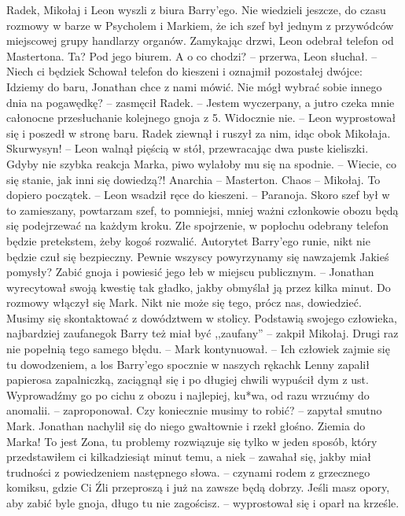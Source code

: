\documentclass[../MAIN.tex]{subfiles}
\begin{document}
Radek, Mikołaj i Leon wyszli z biura Barry’ego. Nie wiedzieli jeszcze, do czasu rozmowy w barze w Psycholem i Markiem, że ich szef był jednym z przywódców miejscowej grupy handlarzy organów. Zamykając drzwi, Leon odebrał telefon od Mastertona.
\sx Ta? Pod jego biurem. A o co chodzi? -- przerwa, Leon słuchał. -- Niech ci będzie\3k \qd
Schował telefon do kieszeni i oznajmił pozostałej dwójce:
\sx Idziemy do baru, Jonathan chce z nami mówić.
\xx Nie mógł wybrać sobie innego dnia na pogawędkę? -- zasmęcił Radek. -- Jestem wyczerpany, a jutro czeka mnie całonocne przesłuchanie kolejnego gnoja z 5.
\xx Widocznie nie. -- Leon wyprostował się i poszedł w stronę baru.
\qd
Radek ziewnął i ruszył za nim, idąc obok Mikołaja.
\sx Skurwysyn! -- Leon walnął pięścią w stół, przewracając dwa puste kieliszki. Gdyby nie szybka reakcja Marka, piwo wylałoby mu się na spodnie. -- Wiecie, co się stanie, jak inni się dowiedzą?!
\xx Anarchia -- Masterton.
\xx Chaos -- Mikołaj.
\xx To dopiero początek. -- Leon wsadził ręce do kieszeni. -- Paranoja. Skoro szef był w to zamieszany, powtarzam szef, to pomniejsi, mniej ważni członkowie obozu będą się podejrzewać na każdym kroku. Złe spojrzenie, w popłochu odebrany telefon będzie pretekstem, żeby kogoś rozwalić. Autorytet Barry’ego runie, nikt nie będzie czuł się bezpieczny. Pewnie wszyscy powyrzynamy się nawzajem\3k Jakieś pomysły?
\xx Zabić gnoja i powiesić jego łeb w miejscu publicznym. -- Jonathan wyrecytował swoją kwestię tak gładko, jakby obmyślał ją przez kilka minut.
\qd
Do rozmowy włączył się Mark.
\sx Nikt nie może się tego, prócz nas, dowiedzieć. Musimy się skontaktować z dowództwem w stolicy. Podstawią swojego człowieka, najbardziej zaufanego\3k
\xx Barry też miał być ,,zaufany'' -- zakpił Mikołaj.
\xx Drugi raz nie popełnią tego samego błędu. -- Mark kontynuował. -- Ich człowiek zajmie się tu dowodzeniem, a los Barry’ego spocznie w naszych rękach\3k
\qd
Lenny zapalił papierosa zapalniczką, zaciągnął się i po długiej chwili wypuścił dym z ust.
\sx Wyprowadźmy go po cichu z obozu i najlepiej, ku*wa, od razu wrzućmy do anomalii. -- zaproponował.
\xx Czy koniecznie musimy to robić? -- zapytał smutno Mark. \qd
Jonathan nachylił się do niego gwałtownie i rzekł głośno.
\sx Ziemia do Marka! To jest Zona, tu problemy rozwiązuje się tylko w jeden sposób, który przedstawiłem ci kilkadziesiąt minut temu, a nie\3k -- zawahał się, jakby miał trudności z powiedzeniem następnego słowa. -- czynami rodem z grzecznego komiksu, gdzie Ci Źli przeproszą i już na zawsze będą dobrzy. Jeśli masz opory, aby zabić byle gnoja, długo tu nie zagościsz. -- wyprostował się i oparł na krześle.
\end{document}
